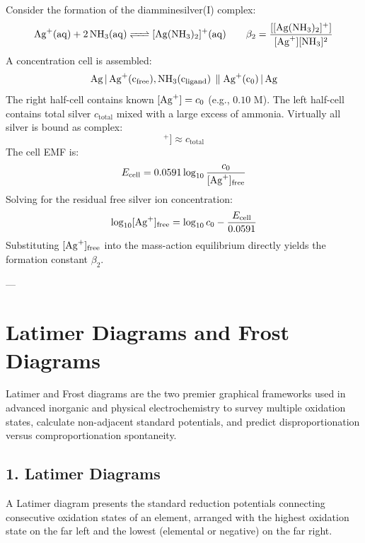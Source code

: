 Consider the formation of the diamminesilver(I) complex:
\begin{equation}
    \ce{Ag+(aq) + 2NH3(aq) <=> [Ag(NH3)2]+(aq)} \qquad \beta_2 = \frac{[[\ce{Ag(NH3)2}]^+]}{[\ce{Ag+}][\ce{NH3}]^2}
\end{equation}
A concentration cell is assembled:
\begin{equation}
    \ce{Ag | Ag+(c_{\text{free}}), NH3(c_{\text{ligand}}) \parallel Ag+(c_0) | Ag}
\end{equation}
The right half-cell contains known $[\ce{Ag+}] = c_0$ (e.g., $0.10\text{ M}$).
The left half-cell contains total silver $c_{\text{total}}$ mixed with a large excess of ammonia. Virtually all silver is bound as complex:
\begin{equation}
    [[\ce{Ag(NH3)2}]^+] \approx c_{\text{total}}
\end{equation}
The cell EMF is:
\begin{equation}
    E_{\text{cell}} = 0.0591 \log_{10} \frac{c_0}{[\ce{Ag+}]_{\text{free}}}
\end{equation}
Solving for the residual free silver ion concentration:
\begin{equation}
    \log_{10}[\ce{Ag+}]_{\text{free}} = \log_{10} c_0 - \frac{E_{\text{cell}}}{0.0591}
\end{equation}
Substituting $[\ce{Ag+}]_{\text{free}}$ into the mass-action equilibrium directly yields the formation constant $\beta_2$.

---

\section{Latimer Diagrams and Frost Diagrams}

Latimer and Frost diagrams are the two premier graphical frameworks used in advanced inorganic and physical electrochemistry to survey multiple oxidation states, calculate non-adjacent standard potentials, and predict disproportionation versus comproportionation spontaneity.

\subsection{1. Latimer Diagrams}
A Latimer diagram presents the standard reduction potentials connecting consecutive oxidation states of an element, arranged with the highest oxidation state on the far left and the lowest (elemental or negative) on the far right.

